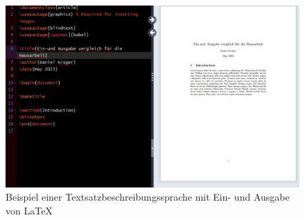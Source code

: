 \begin{figure}[h]
	\centering
	\includegraphics[scale=0.5]{Images/Vergleich_LaTeX.png}
	\caption{Beispiel einer Textsatzbeschreibungssprache mit Ein- und Ausgabe von LaTeX}
	\label{VergleichLaTeX}
\end{figure}


